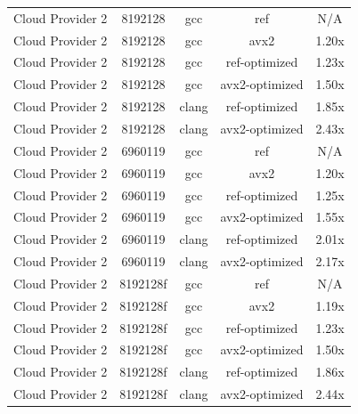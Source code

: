 \begin{table}[H]
\begin{tabularx}{\linewidth}{X c c c c}
            Cloud Provider 2 &              8192128 &                  gcc &                  ref &                  N/A\\
            Cloud Provider 2 &              8192128 &                  gcc &                 avx2 &                1.20x\\
            Cloud Provider 2 &              8192128 &                  gcc &        ref-optimized &                1.23x\\
            Cloud Provider 2 &              8192128 &                  gcc &       avx2-optimized &                1.50x\\
            Cloud Provider 2 &              8192128 &                clang &        ref-optimized &                1.85x\\
            Cloud Provider 2 &              8192128 &                clang &       avx2-optimized &                2.43x\\
            Cloud Provider 2 &              6960119 &                  gcc &                  ref &                  N/A\\
            Cloud Provider 2 &              6960119 &                  gcc &                 avx2 &                1.20x\\
            Cloud Provider 2 &              6960119 &                  gcc &        ref-optimized &                1.25x\\
            Cloud Provider 2 &              6960119 &                  gcc &       avx2-optimized &                1.55x\\
            Cloud Provider 2 &              6960119 &                clang &        ref-optimized &                2.01x\\
            Cloud Provider 2 &              6960119 &                clang &       avx2-optimized &                2.17x\\
            Cloud Provider 2 &             8192128f &                  gcc &                  ref &                  N/A\\
            Cloud Provider 2 &             8192128f &                  gcc &                 avx2 &                1.19x\\
            Cloud Provider 2 &             8192128f &                  gcc &        ref-optimized &                1.23x\\
            Cloud Provider 2 &             8192128f &                  gcc &       avx2-optimized &                1.50x\\
            Cloud Provider 2 &             8192128f &                clang &        ref-optimized &                1.86x\\
            Cloud Provider 2 &             8192128f &                clang &       avx2-optimized &                2.44x\\
        \bottomrule
    \end{tabularx}
\end{table}

